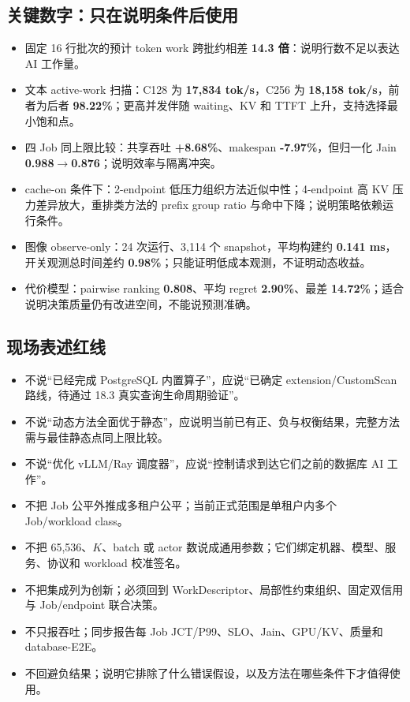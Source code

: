 \documentclass[10pt,a4paper]{ctexart}
\begin{document}
\subsection{关键数字：只在说明条件后使用}
\begin{itemize}
  \item 固定 16 行批次的预计 token work 跨批约相差 \textbf{14.3 倍}：说明行数不足以表达 AI 工作量。
  \item 文本 active-work 扫描：C128 为 \textbf{17,834 tok/s}，C256 为 \textbf{18,158 tok/s}，前者为后者 \textbf{98.22\%}；更高并发伴随 waiting、KV 和 TTFT 上升，支持选择最小饱和点。
  \item 四 Job 同上限比较：共享吞吐 \textbf{+8.68\%}、makespan \textbf{-7.97\%}，但归一化 Jain \textbf{0.988$\rightarrow$0.876}；说明效率与隔离冲突。
  \item cache-on 条件下：2-endpoint 低压力组织方法近似中性；4-endpoint 高 KV 压力差异放大，重排类方法的 prefix group ratio 与命中下降；说明策略依赖运行条件。
  \item 图像 observe-only：24 次运行、3,114 个 snapshot，平均构建约 \textbf{0.141 ms}，开关观测总时间差约 \textbf{0.98\%}；只能证明低成本观测，不证明动态收益。
  \item 代价模型：pairwise ranking \textbf{0.808}、平均 regret \textbf{2.90\%}、最差 \textbf{14.72\%}；适合说明决策质量仍有改进空间，不能说预测准确。
\end{itemize}

\subsection{现场表述红线}
\begin{itemize}
  \item 不说“已经完成 PostgreSQL 内置算子”，应说“已确定 extension/CustomScan 路线，待通过 18.3 真实查询生命周期验证”。
  \item 不说“动态方法全面优于静态”，应说明当前已有正、负与权衡结果，完整方法需与最佳静态点同上限比较。
  \item 不说“优化 vLLM/Ray 调度器”，应说“控制请求到达它们之前的数据库 AI 工作”。
  \item 不把 Job 公平外推成多租户公平；当前正式范围是单租户内多个 Job/workload class。
  \item 不把 65,536、$K$、batch 或 actor 数说成通用参数；它们绑定机器、模型、服务、协议和 workload 校准签名。
  \item 不把集成列为创新；必须回到 WorkDescriptor、局部性约束组织、固定双信用与 Job/endpoint 联合决策。
  \item 不只报吞吐；同步报告每 Job JCT/P99、SLO、Jain、GPU/KV、质量和 database-E2E。
  \item 不回避负结果；说明它排除了什么错误假设，以及方法在哪些条件下才值得使用。
\end{itemize}
\end{document}
